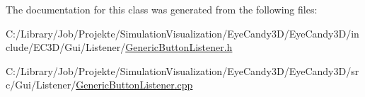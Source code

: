 The documentation for this class was generated from the following files\+:\begin{DoxyCompactItemize}
\item 
C\+:/\+Library/\+Job/\+Projekte/\+Simulation\+Visualization/\+Eye\+Candy3\+D/\+Eye\+Candy3\+D/include/\+E\+C3\+D/\+Gui/\+Listener/\mbox{\hyperlink{_generic_button_listener_8h}{Generic\+Button\+Listener.\+h}}\item 
C\+:/\+Library/\+Job/\+Projekte/\+Simulation\+Visualization/\+Eye\+Candy3\+D/\+Eye\+Candy3\+D/src/\+Gui/\+Listener/\mbox{\hyperlink{_generic_button_listener_8cpp}{Generic\+Button\+Listener.\+cpp}}\end{DoxyCompactItemize}
